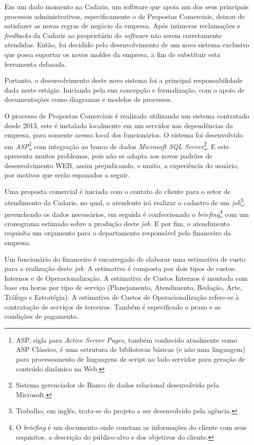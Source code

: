 \documentclass[
  12pt,				%
  openany,
  oneside,
  a4paper,			%
  english,			%
  brazil
]{article}
\numberwithin{figure}{section}
\numberwithin{table}{section}
\begin{document}
Em um dado momento na Cadaris, um software que apoia um dos seus principais processos administrativos, especificamente o de Propostas Comerciais, deixou de satisfazer as novas regras de negócio da empresa. Após inúmeras reclamações e \textit{feedbacks} da Cadaris ao proprietário do \textit{software} não serem corretamente atendidas. Então, foi decidido pelo desenvolvimento de um novo sistema exclusivo que possa suportar os novos moldes da empresa, a fim de substituir esta ferramenta defasada.

Portanto, o desenvolvimento deste novo sistema foi a principal responsabilidade dada neste estágio. Iniciando pela sua concepção e formalização, com o apoio de documentações como diagramas e modelos de processos.

O processo de Propostas Comerciais é realizado utilizando um sistema contratado desde 2013, este é instalado localmente em um servidor nas dependências da empresa, para somente acesso local dos funcionários. O sistema foi desenvolvido em \textit{ASP}\footnote{ASP, sigla para \textit{Active Server Pages}, também conhecido atualmente como ASP Clássico, é uma estrutura de bibliotecas básicas (e não uma linguagem) para processamento de linguagens de script no lado servidor para geração de conteúdo dinâmico na Web.} com integração ao banco de dados \textit{Microsoft SQL Server}\footnote{Sistema gerenciador de Banco de dados relacional desenvolvido pela Microsoft.}. E este apresenta muitos problemas, pois não se adapta aos novos padrões de desenvolvimento WEB, assim prejudicando, e muito, a experiência do usuário, por motivos que serão espanados a seguir.

Uma proposta comercial é iniciada com o contato do cliente para o setor de atendimento da Cadaris, no qual, o atendente irá realizar o cadastro de um \textit{job}\footnote{Trabalho, em inglês, trata-se do projeto a ser desenvolvido pela agência.}, preenchendo os dados necessários, em seguida é confeccionado o \textit{briefing}\footnote{O \textit{briefing} é um documento onde constam as informações do cliente com seus requisitos, a descrição do público-alvo e dos objetivos do cliente.} com um cronograma estimado sobre a produção deste \textit{job}. E por fim, o atendimento requisita um orçamento para o departamento responsável pelo financeiro da empresa. 

Um funcionário do financeiro é encarregado de elaborar uma estimativa de custo para a realização deste \textit{job}. A estimativa é composta por dois tipos de custos: Internos e de Operacionalização. A estimativa de Custos Internos é montada com base em horas por tipo de serviço (Planejamento, Atendimento, Redação, Arte, Tráfego e Estratégia). A estimativa de Custos de Operacionalização refere-se à contratação de serviços de terceiros. Também é especificado o prazo e as condições de pagamento.
\end{document}

